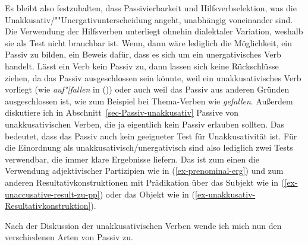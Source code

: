 Es bleibt also festzuhalten, dass Passivierbarkeit und Hilfsverbselektion, was die
Unakkusativ/""Unergativunterscheidung angeht, unabhängig voneinander sind. Die Verwendung der
Hilfsverben unterliegt ohnehin dialektaler Variation, weshalb sie als Test nicht brauchbar
ist. Wenn, dann wäre lediglich die Möglichkeit, ein Passiv zu bilden, ein Beweis dafür, dass es sich
um ein unergativisches Verb handelt. Lässt ein Verb kein Passiv zu, dann lassen sich keine
Rückschlüsse ziehen, da das Passiv ausgeschlossen sein könnte, weil ein unakkusativisches Verb
vorliegt (wie \emph{auf"|fallen} in ()) oder auch weil das Passiv aus anderen Gründen ausgeschlossen ist, wie zum Beispiel bei
Thema-Verben wie \emph{gefallen}. 
\eal
{}
\zl
Außerdem diskutiere ich in Abschnitt~\ref{sec-Passiv-unakkusativ}
Passive von unakkusativischen Verben, die ja eigentlich kein Passiv erlauben sollten. Das bedeutet,
dass das Passiv auch kein geeigneter Test für Unakkusativität ist. Für die Einordnung als
unakkusativisch/unergativisch sind also lediglich zwei Tests verwendbar, die immer klare Ergebnisse
liefern. Das ist zum einen die Verwendung adjektivischer Partizipien wie in (\ref{ex-prenominal-erg}) und zum anderen
Resultativkonstruktionen mit Prädikation über das Subjekt wie in
(\ref{ex-unaccusative-result-zu-pp}) oder das Objekt wie in (\ref{ex-unakkusativ-Resultativkonstruktion}).

Nach der Diskussion der unakkusativischen Verben wende ich mich nun den verschiedenen Arten von Passiv zu.
%
%

